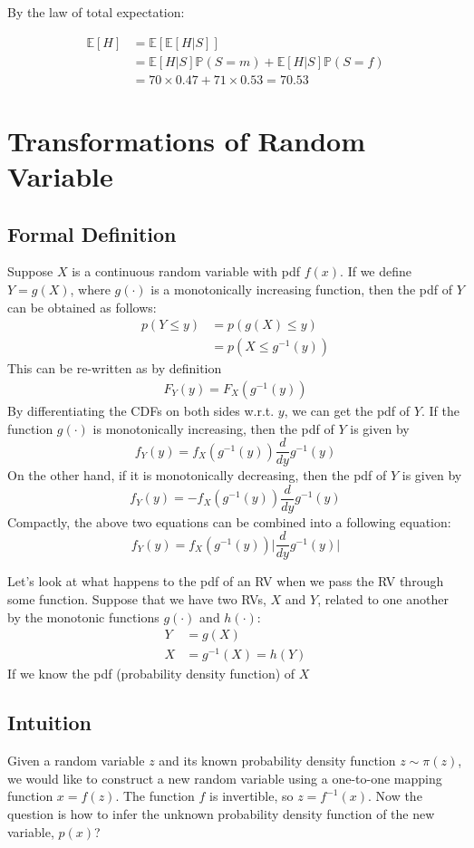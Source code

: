 By the law of total expectation:

\begin{align*}
	\mathbb{E}[H] &= \mathbb{E}[\mathbb{E}[H|S]]\\
				  &= \mathbb{E}[H|S]\mathbb{P}(S=m) + \mathbb{E}[H|S]\mathbb{P}(S=f)\\
			   &= 70\times 0.47 + 71\times 0.53 = 70.53
\end{align*}

\section{Transformations of Random Variable}
\subsection{Formal Definition}
Suppose $X$ is a continuous random variable with pdf $f(x)$. If we define $Y=g(X)$, where $g(\cdot)$ is a monotonically increasing function, then the pdf of $Y$ can be obtained as follows:
\begin{align*}
	p(Y\leq y) &= p(g(X)\leq y)\\
	& = p(X\leq g^{-1}(y))
\end{align*}
This can be re-written as by definition
\begin{align*}
F_Y(y) = F_X(g^{-1}(y))
\end{align*}
By differentiating the CDFs on both sides w.r.t. $y$, we can get the pdf of $Y$. If the function $g(\cdot)$ is monotonically increasing, then the pdf of $Y$ is given by
$$f_Y(y) = f_X(g^{-1}(y))\frac{d}{dy}g^{-1}(y)$$
On the other hand, if it is monotonically decreasing, then the pdf of $Y$ is given by
$$f_Y(y) = - f_X(g^{-1}(y))\frac{d}{dy}g^{-1}(y)$$
Compactly, the above two equations can be combined into a following equation:
$$f_Y(y) = f_X(g^{-1}(y))\Bigg|\frac{d}{dy}g^{-1}(y)\Bigg|$$

Let's look at what happens to the pdf of an RV when we pass the RV through some function. Suppose that we have two RVs, $X$ and $Y$, related to one another by the monotonic functions $g(\cdot)$ and $h(\cdot)$:
\begin{align*}
	Y &= g(X)\\
	X &= g^{-1}(X) = h(Y)
\end{align*}
If we know the pdf (probability density function) of $X$ 

\subsection{Intuition}
Given a random variable $z$ and its known probability density function $z\sim \pi(z)$, we would like to construct a new random variable using a one-to-one mapping function $x=f(z)$. The function $f$ is invertible, so $z = f^{-1}(x)$. Now the question is how to infer the unknown probability density function of the new variable, $p(x)$?

